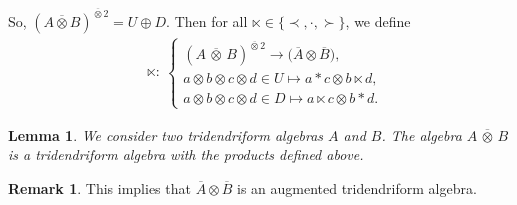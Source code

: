 \documentclass[pdftex]{sigma}
\numberwithin{equation}{section}
\theoremstyle{definition}
\newtheorem{Rq}[defi]{Remark}
\theoremstyle{plain}
\newtheorem{Lemme}[defi]{Lemma}
\begin{document}
So, $(A\overline{\otimes} B)^{\overline{\otimes} 2}=U\oplus D$. Then for all $\ltimes \in\{\prec,\cdot,\succ\}$, we define
\begin{align*}
&\ltimes\colon \ \begin{cases}
 (A\,\overline{\otimes}\, B)^{\overline{\otimes} 2} \rightarrow \big(\overline{A}\otimes \overline{B}\big), \\
a\otimes b\otimes c\otimes d\in U \mapsto a*c\otimes b\ltimes d, \\
a\otimes b\otimes c\otimes d \in D \mapsto a\ltimes c \otimes b*d.
\end{cases}
\end{align*}


\begin{Lemme}
	We consider two tridendriform algebras $A$ and $B$. The algebra $A\,\overline{\otimes}\, B$ is a tridendriform algebra with the products defined above.
\end{Lemme}
\begin{Rq}
	This implies that $\overline{A}\otimes\overline{B}$ is an augmented tridendriform algebra.
\end{Rq}
\end{document}
